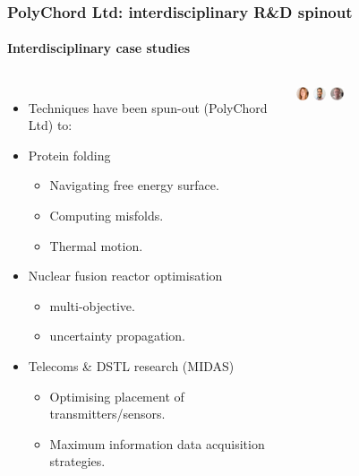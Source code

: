 \documentclass[aspectratio=169, handout]{beamer}
\begin{document}
\begin{frame}
    \frametitle{PolyChord Ltd: interdisciplinary R\&D spinout}
    \framesubtitle{Interdisciplinary case studies}
    \begin{columns}
        \begin{itemize}
            \item Techniques have been spun-out (PolyChord Ltd) to:
            \item Protein folding
                \begin{itemize}
                    \item Navigating free energy surface.
                    \item Computing misfolds.
                    \item Thermal motion.
                \end{itemize}
            \item Nuclear fusion reactor optimisation
                \begin{itemize}
                    \item multi-objective.
                    \item uncertainty propagation.
                \end{itemize}
            \item Telecoms \& DSTL research (MIDAS)
                \begin{itemize}
                    \item Optimising placement of transmitters/sensors.
                    \item Maximum information data acquisition strategies.
                \end{itemize}
        \end{itemize}
        \includegraphics[width=0.08\textwidth]{figures/headshots/catherine-watkinson-polychord.jpg}%
        \includegraphics[width=0.08\textwidth]{figures/headshots/thomas-macaloone-polychord.jpg}%
        \includegraphics[width=0.08\textwidth]{figures/headshots/angus-peters-polychord.jpg}%

\end{columns}
\end{frame}
\end{document}
